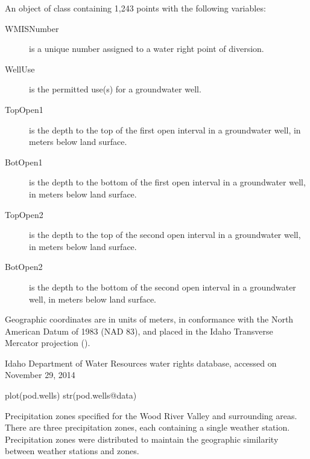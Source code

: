 \documentclass[letterpaper]{book}
\begin{document}
\begin{Format}
An object of  class containing 1,243 points with the following variables:
\begin{description}

\item[WMISNumber] is a unique number assigned to a water right point of diversion.
\item[WellUse] is the permitted use(s) for a groundwater well.
\item[TopOpen1] is the depth to the top of the first open interval in a groundwater well, in meters below land surface.
\item[BotOpen1] is the depth to the bottom of the first open interval in a groundwater well, in meters below land surface.
\item[TopOpen2] is the depth to the top of the second open interval in a groundwater well, in meters below land surface.
\item[BotOpen2] is the depth to the bottom of the second open interval in a groundwater well, in meters below land surface.

\end{description}

Geographic coordinates are in units of meters, in conformance with the North American Datum of 1983 (NAD 83), and placed in the
Idaho Transverse Mercator projection ().
\end{Format}
%
\begin{Source}\relax
Idaho Department of Water Resources water rights database, accessed on November 29, 2014
\end{Source}
%
\begin{SeeAlso}\relax
{}
\end{SeeAlso}
%
\begin{Examples}
\begin{ExampleCode}
plot(pod.wells)
str(pod.wells@data)
\end{ExampleCode}
\end{Examples}
%
\begin{Description}\relax
Precipitation zones specified for the Wood River Valley and surrounding areas.
There are three precipitation zones, each containing a single weather station.
Precipitation zones were distributed to maintain the geographic similarity between weather stations and zones.
\end{Description}
\end{document}

